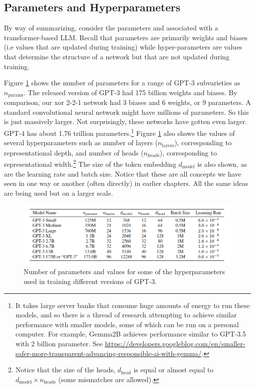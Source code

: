 \subsection{Parameters and Hyperparameters}

By way of summarizing, consider the parameters and  
associated with a transformer-based LLM. Recall that parameters are primarily
weights and biases (i.e values that are updated during training) while
hyper-parameters are values that determine the structure of a network but that
are not updated during training.

Figure \ref{gptParams} shows the  number of parameters for a range of GPT-3
subvarieties as $n_\text{params}$. The released version of GPT-3 had 175
billion weights and biases. By comparison, our xor 2-2-1 network had 3 biases
and 6 weights, or 9 parameters. A standard convolutional neural network might
have millions of parameters. So this is just massively larger. Not
surprisingly, these networks have gotten even larger. GPT-4 has about 1.76
trillion parameters.\footnote{It takes large server banks that  consume huge
amounts of energy to run these models, and so there is a thread of research
attempting to achieve similar performance with smaller models, some of which
can be run on a  personal computer. For example, Gemma2B achieves performance
similar to GPT-3.5 with 2 billion parameter. See
\url{https://developers.googleblog.com/en/smaller-safer-more-transparent-advancing-responsible-ai-with-gemma/}.}
Figure \ref{gptParams} also shows the values of several hyperparameters such as
number of layers ($n_\text{layers}$), corresponding to representational depth,
and number of heads ($n_\text{heads}$), corresponding to representational
width.\footnote{Notice that the size of the heads, $d_\text{head}$ is equal or
almost equal to  $d_\text{model} \times n_\text{heads}$ (some mismatches are
allowed).} The size of the token embedding  $d_\text{model}$ is also shown, as
are the learning rate and batch size. Notice that these are all concepts we
have seen in one way or another (often directly) in earlier chapters. All the
same ideas are being used but on a larger scale.

\begin{figure}[ht]
\centering
\includegraphics[scale=.4]{./images/gpt3_params.png}
\caption[\url{https://arxiv.org/abs/2005.14165}.]{Number of parameters and
values for some of the hyperparameters used in training different versions of
GPT-3.
}
\label{gptParams}
\end{figure}

